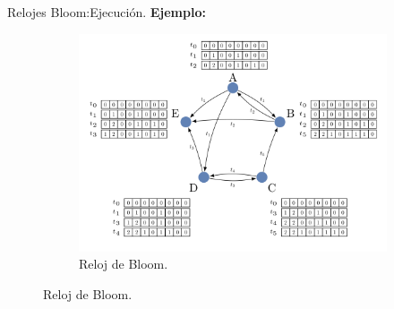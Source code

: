 \begin{frame}[fragile]{Relojes Bloom:}{Ejecución.}
  \justifying
  \textbf{Ejemplo:}
      \begin{figure}
    \centering
    \begin{subfigure}[b]{0.8\textwidth}
      \includegraphics[width=\textwidth]{./Imagenes/RelojBloom}
      \caption{Reloj de Bloom.}
      \label{fig:Ejemplo de un CountingBloomClock.}
    \end{subfigure}
  \end{figure}
\end{frame}
